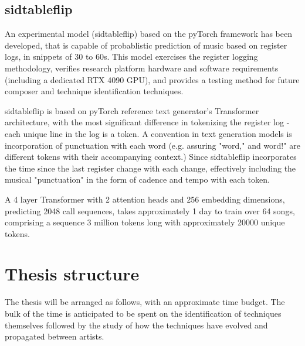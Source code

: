 \documentclass[10pt]{article}
\begin{document}
\begin{multicols*}{2}
  \subsection{sidtableflip}
  An experimental model (sidtableflip) based on the pyTorch framework has been
  developed, that is capable of probablistic prediction of music based on
  register logs, in snippets of 30 to 60s. This model exercises the register
  logging methodology, verifies research platform hardware and software requirements
  (including a dedicated RTX 4090 GPU), and provides a testing method for future
  composer and technique identification techniques.

  sidtableflip is based on pyTorch reference text generator's Transformer
  architecture, with the most significant difference in tokenizing the
  register log - each unique line in the log is a token. A convention in text
  generation models is incorporation of punctuation
  with each word (e.g. assuring "word," and word!" are different tokens with
  their accompanying context.) Since sidtableflip incorporates the time since the last
  register change with each change, effectively including the musical "punctuation"
  in the form of cadence and tempo with each token.

  A 4 layer Transformer with 2 attention heads and 256 embedding dimensions,
  predicting 2048 call sequences, takes approximately 1 day to train over 64 songs,
  comprising a sequence 3 million tokens long with approximately 20000 unique tokens.


  \section{Thesis structure}
  The thesis will be arranged as follows, with an approximate time budget. The bulk of the time
  is anticipated to be spent on the identification of techniques themselves followed by the
  study of how the techniques have evolved and propagated between artists.


\end{multicols*}
\end{document}
